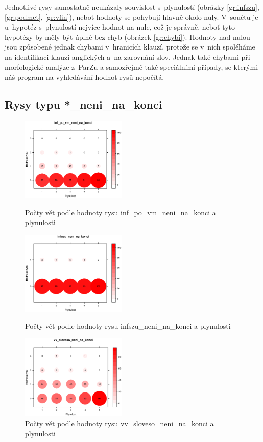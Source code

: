 \documentclass[12pt,a4paper]{report}
\begin{document}
Jednotlivé rysy samostatně neukázaly souvislost s~plynulostí (obrázky \ref{gr:infszu}, \ref{gr:podmet}, \ref{gr:vfin}), neboť hodnoty se pohybují hlavně okolo nuly. V~součtu je u~hypotéz s~plynulostí nejvíce hodnot na nule, což je správně, neboť tyto hypotézy by měly být úplně bez chyb (obrázek \ref{gr:chybi}). Hodnoty nad nulou jsou způsobené jednak chybami v~hranicích klauzí, protože se v~nich spoléháme na identifikaci klauzí anglických a~na zarovnání slov. Jednak také chybami při morfologické analýze z~ParZu a samozřejmě také speciálními případy, se kterými náš program na vyhledávání hodnot rysů nepočítá.

\pagebreak


\subsection{Rysy typu *\_neni\_na\_konci}
\begin{figure}[!htb]
  \centering\includegraphics[width=50mm]{./grafy/rysy/inf_po_vm_neni_na_konci-c.eps}
  \caption{Počty vět podle hodnoty rysu inf\_po\_vm\_neni\_na\_konci a plynulosti}\label{gr:vm}
\endminipage\hfill
{}
  \centering\includegraphics[width=50mm]{./grafy/rysy/infszu_neni_na_konci-c.eps}
  \caption{Počty vět podle hodnoty rysu infszu\_neni\_na\_konci a plynulosti}\label{gr:infszu_konec}
\endminipage\hfill
{}
  \centering\includegraphics[width=50mm]{./grafy/rysy/vv_sloveso_neni_na_konci-c.eps}
  \caption{Počty vět podle hodnoty rysu vv\_sloveso\_neni\_na\_konci a plynulosti}\label{gr:vvsloveso}
\endminipage\hfill
\end{figure}
\end{document}
